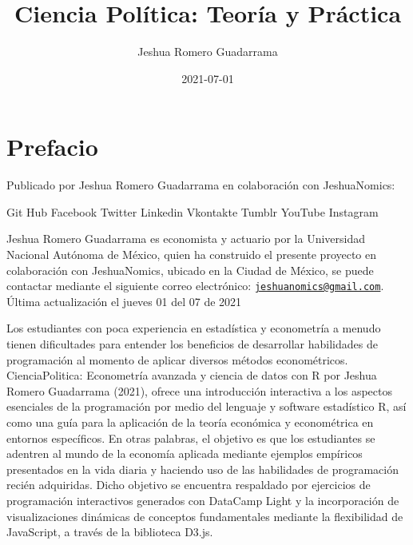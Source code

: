 \documentclass[
]{book}
\title{Ciencia Política: Teoría y Práctica}
\author{Jeshua Romero Guadarrama}
\date{2021-07-01}
\begin{document}
\maketitle

{
\setcounter{tocdepth}{1}
\tableofcontents
}
\hypertarget{prefacio}{%
\chapter*{Prefacio}\label{prefacio}}

Publicado por Jeshua Romero Guadarrama en colaboración con JeshuaNomics:

{ Git Hub}
{ Facebook}
{ Twitter}
{ Linkedin}
{ Vkontakte}
{ Tumblr}
{ YouTube}
{ Instagram}

Jeshua Romero Guadarrama es economista y actuario por la Universidad Nacional Autónoma de México, quien ha construido el presente proyecto en colaboración con JeshuaNomics, ubicado en la Ciudad de México, se puede contactar mediante el siguiente correo electrónico: \href{mailto:jeshuanomics@gmail.com}{\nolinkurl{jeshuanomics@gmail.com}}.
Última actualización el jueves 01 del 07 de 2021

Los estudiantes con poca experiencia en estadística y econometría a menudo tienen dificultades para entender los beneficios de desarrollar habilidades de programación al momento de aplicar diversos métodos econométricos. CienciaPolitica: Econometría avanzada y ciencia de datos con R por Jeshua Romero Guadarrama (2021), ofrece una introducción interactiva a los aspectos esenciales de la programación por medio del lenguaje y software estadístico R, así como una guía para la aplicación de la teoría económica y econométrica en entornos específicos. En otras palabras, el objetivo es que los estudiantes se adentren al mundo de la economía aplicada mediante ejemplos empíricos presentados en la vida diaria y haciendo uso de las habilidades de programación recién adquiridas. Dicho objetivo se encuentra respaldado por ejercicios de programación interactivos generados con DataCamp Light y la incorporación de visualizaciones dinámicas de conceptos fundamentales mediante la flexibilidad de JavaScript, a través de la biblioteca D3.js.
\end{document}
